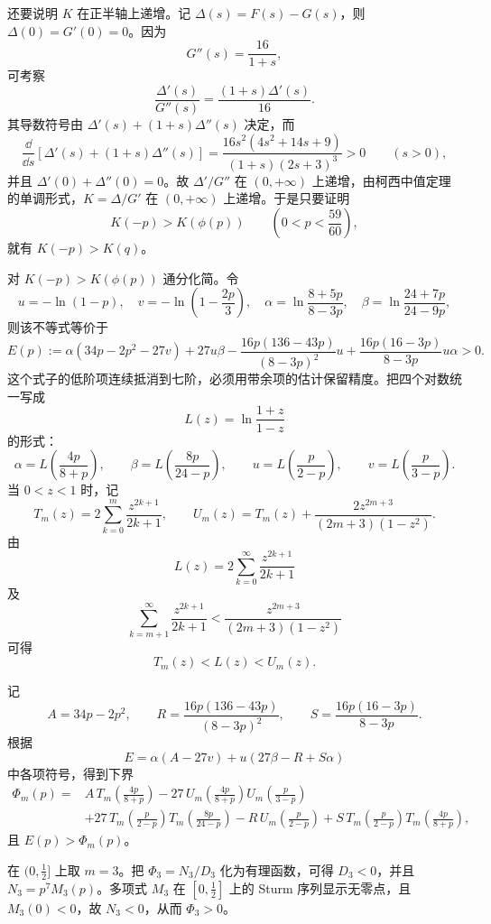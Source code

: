 \begin{solution}
还要说明 $K$ 在正半轴上递增。记 $\Delta(s)=F(s)-G(s)$，则 $\Delta(0)=G'(0)=0$。因为
\[
G''(s)=\frac{16}{1+s},
\]
可考察
\[
\frac{\Delta'(s)}{G''(s)}=\frac{(1+s)\Delta'(s)}{16}.
\]
其导数符号由 $\Delta'(s)+(1+s)\Delta''(s)$ 决定，而
\[
\frac{\dd}{\dd s}\left[\Delta'(s)+(1+s)\Delta''(s)\right]
=\frac{16s^2(4s^2+14s+9)}{(1+s)(2s+3)^3}>0\qquad(s>0),
\]
并且 $\Delta'(0)+\Delta''(0)=0$。故 $\Delta'/G''$ 在 $(0,+\infty)$ 上递增，由柯西中值定理的单调形式，$K=\Delta/G'$ 在 $(0,+\infty)$ 上递增。于是只要证明
\[
K(-p)>K(\phi(p))\qquad\left(0<p<\frac{59}{60}\right),
\]
就有 $K(-p)>K(q)$。

对 $K(-p)>K(\phi(p))$ 通分化简。令
\[
u=-\ln(1-p),\quad v=-\ln\left(1-\frac{2p}{3}\right),\quad
\alpha=\ln\frac{8+5p}{8-3p},\quad
\beta=\ln\frac{24+7p}{24-9p},
\]
则该不等式等价于
\[
E(p):=\alpha(34p-2p^2-27v)+27u\beta
-\frac{16p(136-43p)}{(8-3p)^2}u
+\frac{16p(16-3p)}{8-3p}u\alpha>0.
\]
这个式子的低阶项连续抵消到七阶，必须用带余项的估计保留精度。把四个对数统一写成
\[
L(z)=\ln\frac{1+z}{1-z}
\]
的形式：
\[
\alpha=L\left(\frac{4p}{8+p}\right),\qquad
\beta=L\left(\frac{8p}{24-p}\right),\qquad
u=L\left(\frac{p}{2-p}\right),\qquad
v=L\left(\frac{p}{3-p}\right).
\]
当 $0<z<1$ 时，记
\[
T_m(z)=2\sum_{k=0}^{m}\frac{z^{2k+1}}{2k+1},\qquad
U_m(z)=T_m(z)+\frac{2z^{2m+3}}{(2m+3)(1-z^2)}.
\]
由
\[
L(z)=2\sum_{k=0}^{\infty}\frac{z^{2k+1}}{2k+1}
\]
及
\[
\sum_{k=m+1}^{\infty}\frac{z^{2k+1}}{2k+1}
<\frac{z^{2m+3}}{(2m+3)(1-z^2)}
\]
可得
\[
T_m(z)<L(z)<U_m(z).
\]

记
\[
A=34p-2p^2,\qquad R=\frac{16p(136-43p)}{(8-3p)^2},\qquad S=\frac{16p(16-3p)}{8-3p}.
\]
根据
\[
E=\alpha(A-27v)+u(27\beta-R+S\alpha)
\]
中各项符号，得到下界
\begin{align*}
\Phi_m(p)=&A\,T_m\!\left(\frac{4p}{8+p}\right)
-27\,U_m\!\left(\frac{4p}{8+p}\right)U_m\!\left(\frac{p}{3-p}\right)\\
&+27\,T_m\!\left(\frac{p}{2-p}\right)T_m\!\left(\frac{8p}{24-p}\right)
-R\,U_m\!\left(\frac{p}{2-p}\right)
+S\,T_m\!\left(\frac{p}{2-p}\right)T_m\!\left(\frac{4p}{8+p}\right),
\end{align*}
且 $E(p)>\Phi_m(p)$。

在 $(0,\frac12]$ 上取 $m=3$。把 $\Phi_3=N_3/D_3$ 化为有理函数，可得 $D_3<0$，并且 $N_3=p^7M_3(p)$。多项式 $M_3$ 在 $[0,\frac12]$ 上的 Sturm 序列显示无零点，且 $M_3(0)<0$，故 $N_3<0$，从而 $\Phi_3>0$。


\end{solution}
